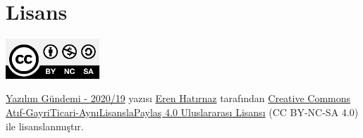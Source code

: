 \documentclass[11pt]{article}
\begin{document}
\section{Lisans}
\label{sec:org1c94e5c}
\begin{center}
\begin{center}
\includegraphics[height=1.5cm]{../../../img/CC_BY-NC-SA_4.0.png}
\end{center}

\href{yazilim-gundemi-2020-19.pdf}{Yazılım Gündemi - 2020/19} yazısı \href{https://erenhatirnaz.github.io}{Eren Hatırnaz} tarafından \href{http://creativecommons.org/licenses/by-nc-sa/4.0/}{Creative Commons
Atıf-GayriTicari-AynıLisanslaPaylaş 4.0 Uluslararası Lisansı} (CC BY-NC-SA 4.0)
ile lisanslanmıştır.
\end{center}
\end{document}
